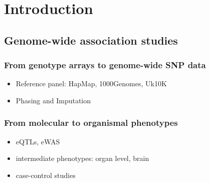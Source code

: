 \section{Introduction}


\subsection{Genome-wide association studies}
\subsubsection{From genotype arrays to genome-wide SNP data}
\begin{itemize}
	\item Reference panel: HapMap, 1000Genomes, Uk10K
	\item Phasing and Imputation
\end{itemize}

\subsubsection{From molecular to organismal phenotypes}
\begin{itemize}
	\item eQTLs, eWAS
	\item intermediate phenotypes: organ level, brain
	\item case-control studies
\end{itemize}

